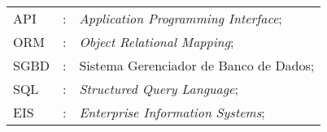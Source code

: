 \cleardoublepage
{}
\begin{tabular}{lcl}

API & : & \textit{Application Programming Interface};\\
ORM & : & \textit{Object Relational Mapping};\\
SGBD & : & Sistema Gerenciador de Banco de Dados;\\
SQL & : & \textit{Structured Query Language};\\
EIS & : & \textit{Enterprise Information Systems};\\

\end{tabular}
